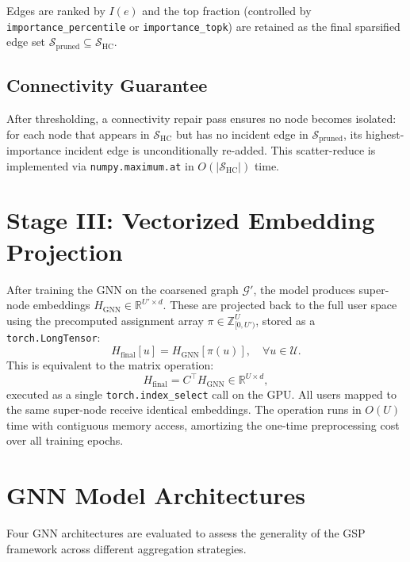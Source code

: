 Edges are ranked by $I(e)$ and the top fraction (controlled by \texttt{importance\_percentile} or \texttt{importance\_topk}) are retained as the final sparsified edge set $\mathcal{S}_\text{pruned} \subseteq \mathcal{S}_\text{HC}$.

\subsection{Connectivity Guarantee}

After thresholding, a connectivity repair pass ensures no node becomes isolated: for each node that appears in $\mathcal{S}_\text{HC}$ but has no incident edge in $\mathcal{S}_\text{pruned}$, its highest-importance incident edge is unconditionally re-added. This scatter-reduce is implemented via \texttt{numpy.maximum.at} in $O(|\mathcal{S}_\text{HC}|)$ time.

\section{Stage III: Vectorized Embedding Projection}
\label{sec:stage3}

After training the GNN on the coarsened graph $\mathcal{G}'$, the model produces super-node embeddings $H_\text{GNN} \in \mathbb{R}^{U' \times d}$. These are projected back to the full user space using the precomputed assignment array $\pi \in \mathbb{Z}_{[0,U')}^{U}$, stored as a \texttt{torch.LongTensor}:
\begin{equation}
    H_\text{final}[u] = H_\text{GNN}[\pi(u)], \quad \forall u \in \mathcal{U}.
    \label{eq:proj}
\end{equation}
This is equivalent to the matrix operation:
\begin{equation}
    H_\text{final} = C^\top H_\text{GNN} \in \mathbb{R}^{U \times d},
    \label{eq:proj_matrix}
\end{equation}
executed as a single \texttt{torch.index\_select} call on the GPU. All users mapped to the same super-node receive identical embeddings. The operation runs in $O(U)$ time with contiguous memory access, amortizing the one-time preprocessing cost over all training epochs.

\section{GNN Model Architectures}
\label{sec:models}

Four GNN architectures are evaluated to assess the generality of the GSP framework across different aggregation strategies.

